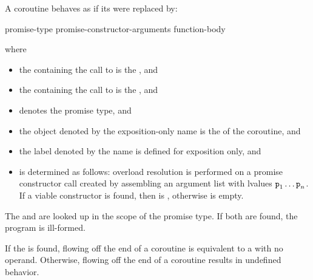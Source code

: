\pnum
A coroutine behaves as if its  were replaced by:
\begin{ncsimplebnf}
\terminal{\{}\br
\bnfindent promise-type  promise-constructor-arguments \terminal{;}\br
\bnfindent {}  \terminal{;}\br
\bnfindent {} \terminal{\{}\br
\bnfindent\bnfindent function-body\br
\bnfindent {}\br
\bnfindent\bnfindent {} \terminal{;}\br
\bnfindent \terminal{\}}\br
{} \terminal{:}\br
\bnfindent {}  \terminal{;}\br
\terminal{\}}
\end{ncsimplebnf}
where
\begin{itemize}
\item
the  containing
the call to 
is the , and
\item
the  containing
the call to 
is the , and
\item
{} denotes the promise type, and
\item
the object denoted by the exposition-only name 
is the  of the coroutine, and
\item
the label denoted by the name 
is defined for exposition only, and
\item
{} is determined as follows:
overload resolution is performed on a promise constructor call created by
assembling an argument list with lvalues $\texttt{p}_1 \dotsc \texttt{p}_n$. If a viable
constructor is found, then
 is
, otherwise
 is empty.
\end{itemize}

\pnum
The  
and  are looked up in the scope of the promise type.
If both are found, the program is ill-formed.
\begin{note}
If the   is found, flowing off
the end of a coroutine is equivalent to a  with no operand.
Otherwise, flowing off the end of a coroutine
results in undefined behavior.
\end{note}

